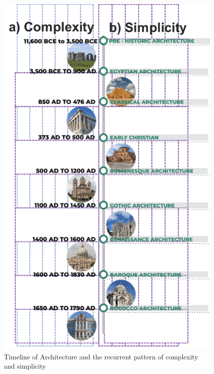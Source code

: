      \begin{figure}[htb]
          \centering
          \includegraphics[width= \linewidth]{Images/TimelineArchitecture}
          \caption{Timeline of Architecture and the recurrent pattern of complexity and simplicity}
          \label{fig:TimelineArchitecture}
        \end{figure}

